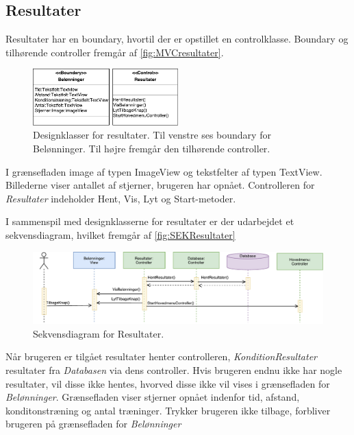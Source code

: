 \subsection*{Resultater}
Resultater har en boundary, hvortil der er opstillet en controlklasse. Boundary og tilhørende controller fremgår af \autoref{fig:MVCresultater}. 

\begin{figure} [H]
\centering
\includegraphics[width=0.5\textwidth]{figures/MVC/MVCResultater}
\caption{Designklasser for resultater. Til venstre ses boundary for Belønninger. Til højre fremgår den tilhørende controller.}
\label{fig:MVCresultater}
\end{figure}

\noindent
I grænsefladen image af typen ImageView og tekstfelter af typen TextView. Billederne viser antallet af stjerner, brugeren har opnået.
Controlleren for \textit{Resultater} indeholder Hent, Vis, Lyt og Start-metoder. 

I sammenspil med designklasserne for resultater er der udarbejdet et sekvensdiagram, hvilket fremgår af \autoref{fig:SEKResultater}

\begin{figure} [H]
\centering
\includegraphics[width=1\textwidth]{figures/Sek/SEKResultater}
\caption{Sekvensdiagram for Resultater.}
\label{fig:SEKResultater}
\end{figure} 

\noindent 
Når brugeren er tilgået resultater henter controlleren, \textit{KonditionResultater} resultater fra \textit{Databasen} via dens controller. Hvis brugeren endnu ikke har nogle resultater, vil disse ikke hentes, hvorved disse ikke vil vises i grænsefladen for \textit{Belønninger}. Grænsefladen viser stjerner opnået indenfor tid, afstand, konditonstræning og antal træninger. Trykker brugeren ikke tilbage, forbliver brugeren på grænsefladen for \textit{Belønninger}

